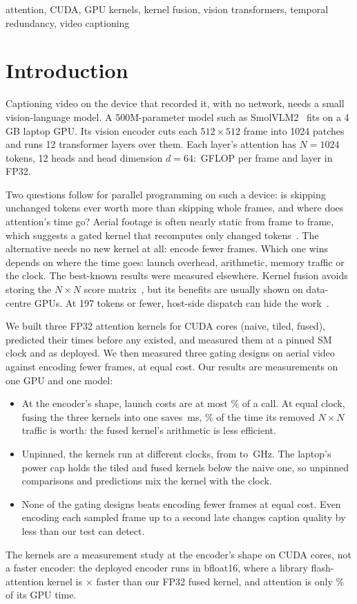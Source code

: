 \documentclass[conference]{IEEEtran}
\newcommand{\NxN}{$N\times N$}
\begin{document}
\begin{IEEEkeywords}
attention, CUDA, GPU kernels, kernel fusion, vision transformers, temporal redundancy, video captioning
\end{IEEEkeywords}

\section{Introduction}
Captioning video on the device that recorded it, with no network, needs a small vision-language model. A
500M-parameter model such as SmolVLM2~\cite{marafioti2025smolvlm} fits on a 4\,GB laptop GPU. Its vision encoder
cuts each $512\times512$ frame into 1024 patches and runs 12 transformer layers over them. Each layer's attention
has $N = 1024$ tokens, 12 heads and head dimension $d = 64$: \AttnGflop\,GFLOP per frame and layer in FP32.

Two questions follow for parallel programming on such a device: is skipping unchanged tokens ever worth more than
skipping whole frames, and where does attention's time go? Aerial footage is often nearly static from frame to
frame, which suggests a gated kernel that recomputes only changed tokens~\cite{dutson2023eventful}. The
alternative needs no new kernel at all: encode fewer frames. Which one wins depends on where the time goes:
launch overhead, arithmetic, memory traffic or the clock. The best-known results were measured elsewhere. Kernel
fusion avoids storing the \NxN{} score matrix~\cite{dao2022flashattention}, but its benefits are usually shown on
data-centre GPUs. At 197 tokens or fewer, host-side dispatch can hide the work~\cite{abdellatif2026dispatch}.

We built three FP32 attention kernels for CUDA cores (naive, tiled, fused), predicted their times before any
existed, and measured them at a pinned SM clock and as deployed. We then measured three gating designs on aerial
video against encoding fewer frames, at equal cost. Our results are measurements on one GPU and one model:
\begin{itemize}
\item At the encoder's shape, launch costs are at most \PinFixedMaxPct\% of a call. At equal clock, fusing the
three kernels into one saves \PinSavingMs\,ms, \PinSavingPctOfNxN\% of the time its removed \NxN{} traffic is
worth: the fused kernel's arithmetic is less efficient.
\item Unpinned, the kernels run at different clocks, from \DepVtwoGhz{} to \DepVoneGhz\,GHz. The laptop's power
cap holds the tiled and fused kernels below the naive one, so unpinned comparisons and predictions mix the kernel
with the clock.
\item None of the gating designs beats encoding fewer frames at equal cost. Even encoding each sampled frame up
to a second late changes caption quality by less than our test can detect.
\end{itemize}
The kernels are a measurement study at the encoder's shape on CUDA cores, not a faster encoder: the deployed
encoder runs in bfloat16, where a library flash-attention kernel is \VthreeOverFlash$\times$ faster than our FP32
fused kernel, and attention is only \EncAttnPct\% of its GPU time.
\end{document}
